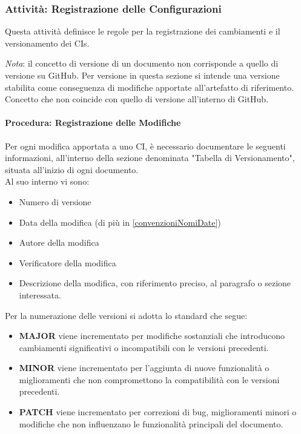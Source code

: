 \documentclass[a4paper,12pt]{article}
\begin{document}
\subsubsection{Attività: Registrazione delle Configurazioni} \label{versionamento_identificazione}
Questa attività definisce le regole per la registrazione dei cambiamenti e il
versionamento dei CIs.

\textit{Nota}: il concetto di versione di un documento non corrisponde a quello di versione su GitHub.
Per versione in questa sezione si intende una versione stabilita come conseguenza di modifiche apportate all'artefatto di riferimento. Concetto che non coincide con quello di versione all'interno di GitHub.

\paragraph{Procedura: Registrazione delle Modifiche}\label{versione}
Per ogni modifica apportata a uno CI, è necessario documentare le seguenti
informazioni, all'interno della sezione denominata "Tabella di Versionamento",
situata all'inizio di ogni documento.\\Al suo interno vi sono:
\begin{itemize}
    \item Numero di versione
    \item Data della modifica (di più in \ref{convenzioniNomiDate})
    \item Autore della modifica
    \item Verificatore della modifica
    \item Descrizione della modifica, con riferimento preciso, al paragrafo o sezione
          interessata.
\end{itemize}
Per la numerazione delle versioni si adotta lo standard che segue:
\begin{itemize}
    \item \textbf{MAJOR} viene incrementato per modifiche sostanziali che introducono cambiamenti significativi o incompatibili con le versioni precedenti.
    \item \textbf{MINOR} viene incrementato per l'aggiunta di nuove funzionalità o miglioramenti che non compromettono la compatibilità con le versioni precedenti.
    \item \textbf{PATCH} viene incrementato per correzioni di bug, miglioramenti minori o modifiche che non influenzano le funzionalità principali del documento.
\end{itemize}
\end{document}
